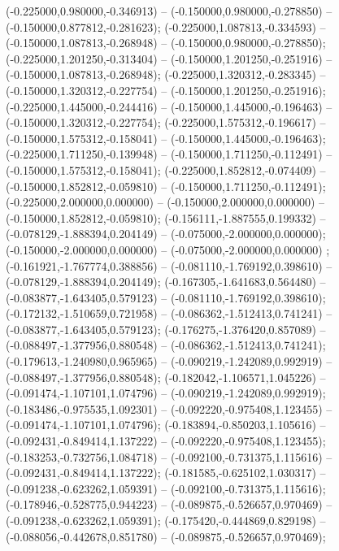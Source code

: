  (-0.225000,0.980000,-0.346913) -- (-0.150000,0.980000,-0.278850) -- (-0.150000,0.877812,-0.281623);
 (-0.225000,1.087813,-0.334593) -- (-0.150000,1.087813,-0.268948) -- (-0.150000,0.980000,-0.278850);
 (-0.225000,1.201250,-0.313404) -- (-0.150000,1.201250,-0.251916) -- (-0.150000,1.087813,-0.268948);
 (-0.225000,1.320312,-0.283345) -- (-0.150000,1.320312,-0.227754) -- (-0.150000,1.201250,-0.251916);
 (-0.225000,1.445000,-0.244416) -- (-0.150000,1.445000,-0.196463) -- (-0.150000,1.320312,-0.227754);
 (-0.225000,1.575312,-0.196617) -- (-0.150000,1.575312,-0.158041) -- (-0.150000,1.445000,-0.196463);
 (-0.225000,1.711250,-0.139948) -- (-0.150000,1.711250,-0.112491) -- (-0.150000,1.575312,-0.158041);
 (-0.225000,1.852812,-0.074409) -- (-0.150000,1.852812,-0.059810) -- (-0.150000,1.711250,-0.112491);
 (-0.225000,2.000000,0.000000) -- (-0.150000,2.000000,0.000000) -- (-0.150000,1.852812,-0.059810);
 (-0.156111,-1.887555,0.199332) -- (-0.078129,-1.888394,0.204149) -- (-0.075000,-2.000000,0.000000);
 (-0.150000,-2.000000,0.000000) -- (-0.075000,-2.000000,0.000000) ;
 (-0.161921,-1.767774,0.388856) -- (-0.081110,-1.769192,0.398610) -- (-0.078129,-1.888394,0.204149);
 (-0.167305,-1.641683,0.564480) -- (-0.083877,-1.643405,0.579123) -- (-0.081110,-1.769192,0.398610);
 (-0.172132,-1.510659,0.721958) -- (-0.086362,-1.512413,0.741241) -- (-0.083877,-1.643405,0.579123);
 (-0.176275,-1.376420,0.857089) -- (-0.088497,-1.377956,0.880548) -- (-0.086362,-1.512413,0.741241);
 (-0.179613,-1.240980,0.965965) -- (-0.090219,-1.242089,0.992919) -- (-0.088497,-1.377956,0.880548);
 (-0.182042,-1.106571,1.045226) -- (-0.091474,-1.107101,1.074796) -- (-0.090219,-1.242089,0.992919);
 (-0.183486,-0.975535,1.092301) -- (-0.092220,-0.975408,1.123455) -- (-0.091474,-1.107101,1.074796);
 (-0.183894,-0.850203,1.105616) -- (-0.092431,-0.849414,1.137222) -- (-0.092220,-0.975408,1.123455);
 (-0.183253,-0.732756,1.084718) -- (-0.092100,-0.731375,1.115616) -- (-0.092431,-0.849414,1.137222);
 (-0.181585,-0.625102,1.030317) -- (-0.091238,-0.623262,1.059391) -- (-0.092100,-0.731375,1.115616);
 (-0.178946,-0.528775,0.944223) -- (-0.089875,-0.526657,0.970469) -- (-0.091238,-0.623262,1.059391);
 (-0.175420,-0.444869,0.829198) -- (-0.088056,-0.442678,0.851780) -- (-0.089875,-0.526657,0.970469);
